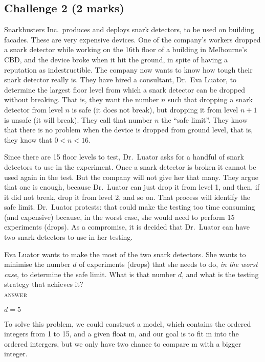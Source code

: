 \documentclass[11pt]{article}
\begin{document}
\subsection*{Challenge 2 \hfill {\small (2 marks)}}

Snarkbusters Inc.\ produces and deploys snark detectors,
to be used on building facades.
These are very expensive devices.
One of the company's workers dropped a snark detector while working on the
16th floor of a building in Melbourne's CBD, and the device broke when it
hit the ground, in spite of having a reputation as indestructible.
The company now wants to know how tough their snark detector really is.
They have hired a consultant, Dr.\ Eva Luator, to determine the
largest floor level from which a snark detector can be dropped
without breaking.
That is, they want the number $n$ such that dropping a snark detector
from level $n$ is safe (it does not break), but dropping it from
level $n+1$ is unsafe (it will break).
They call that number $n$ the ``safe limit''.
They know that there is no problem when the device is dropped from ground
level, that is, they know that $0 < n < 16$.

Since there are 15 floor levels to test, Dr.\ Luator asks for a
handful of snark detectors to use in the experiment.
Once a snark detector is broken it cannot be used again in the test.
But the company will not give her that many.
They argue that one is enough, because Dr.\ Luator can just drop it from
level 1, and then, if it did not break, drop it from level 2, and so on.
That process will identify the safe limit.
Dr.\ Luator protests: that could make the testing too time consuming
(and expensive) because, in the worst case, she would need to perform
15 experiments (drops).
As a compromise, it is decided that Dr.\ Luator can have two snark
detectors to use in her testing.

Eva Luator wants to make the most of the two snark detectors.
She wants to minimise the number $d$ of experiments (drops) that she
needs to do, \emph{in the worst case}, to determine the safe limit.
What is that number $d$, and what is the testing strategy that achieves it?
\\
\textsc{answer}
\par

$d = 5$

To solve this problem, we could construct a model, which contains the ordered
integers
from 1 to 15, and a given float m,
and our goal is to fit m into the ordered intergers,
but we only have two chance to compare m with a bigger integer.
\end{document}
